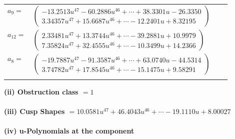\documentclass[1p]{elsarticle_modified}
\theoremstyle{definition}
\begin{document}
\begin{tabular}{m{7pt} m{180pt} m{7pt} m{180pt} }
\flushright $a_{9}=$&$\begin{pmatrix}-13.2513 u^{47}-60.2886 u^{46}+\cdots+38.3301 u-26.3350\\3.34357 u^{47}+15.6687 u^{46}+\cdots-12.2401 u+8.32195\end{pmatrix}$ \\
\flushright $a_{12}=$&$\begin{pmatrix}2.33481 u^{47}+13.3744 u^{46}+\cdots-39.2881 u+10.9979\\7.35824 u^{47}+32.4555 u^{46}+\cdots-10.3499 u+14.2366\end{pmatrix}$ \\
\flushright $a_{8}=$&$\begin{pmatrix}-19.7887 u^{47}-91.3587 u^{46}+\cdots+63.0740 u-44.5314\\3.74782 u^{47}+17.8545 u^{46}+\cdots-15.1475 u+9.58291\end{pmatrix}$\\&\end{tabular}
\flushleft \textbf{(ii) Obstruction class $= 1$}\\~\\
\flushleft \textbf{(iii) Cusp Shapes $= 10.0581 u^{47}+46.4043 u^{46}+\cdots-19.1110 u+8.00027$}\\~\\
\newpage\renewcommand{\arraystretch}{1}
\flushleft \textbf{(iv) u-Polynomials at the component}\newline \\
\end{document}
